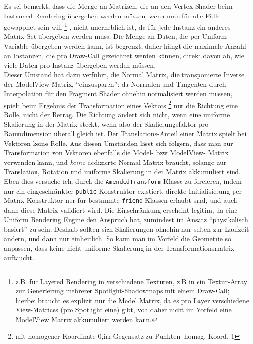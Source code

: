 	Es sei bemerkt, dass die Menge an Matrizen, die an den Vertex Shader beim Instanced Rendering übergeben
	werden müssen, wenn man für alle Fälle gewappnet sein will
	\footnote{z.B. für Layered Rendering in verschiedene Texturen, z.B in ein Textur-Array zur Generierung mehrerer 
	Spotlight-Shadowmaps mit einem Draw-Call; hierbei braucht es explizit nur die Model Matrix, da es pro Layer 
	verschiedene View-Matrices (pro Spotlight eine) gibt, von daher nicht im Vorfeld eine ModelView Matrix akkumuliert 
	werden kann.}
	, nicht unerheblich ist, da für jede Instanz ein anderes Matrix-Set übergeben werden muss.
	Die Menge an Daten, die per Uniform-Variable übergeben werden kann, ist begrenzt, daher hängt die maximale Anzahl
	an Instanzen, die pro Draw-Call gezeichnet werden können, direkt davon ab, wie viele Daten pro Instanz übergeben 
	werden müssen.\\
	Dieser Umstand hat dazu verführt, die Normal Matrix, die transponierte Inverse der ModelView-Matrix,
	"`einzusparen"': da Normalen und Tangenten durch Interpolation für den Fragment Shader ohnehin normalisiert werden 
	müssen, spielt beim Ergebnis  der Transformation eines Vektors 
	\footnote{mit homogener Koordinate 0,im Gegensatz zu Punkten, homog. Koord. 1} 
	nur die Richtung eine Rolle, nicht der Betrag. Die Richtung ändert sich nicht,
	wenn eine uniforme Skalierung in der Matrix steckt, wenn also der Skalierungsfaktor pro Raumdimension überall gleich 
	ist. Der Translations-Anteil einer Matrix spielt bei Vektoren keine Rolle. Aus diesen Umständen lässt sich folgern, 
	dass man zur Transformation von Vektoren ebenfalls die Model- bzw ModelView- Matrix verwenden kann, 
	und \emph{keine} dedizierte Normal Matrix braucht,
	solange nur Translation, Rotation und uniforme Skalierung in der Matrix akkumuliert sind.\\
	Eben dies versuche ich, durch die \lstinline|AmendedTransform|-Klasse zu forcieren, indem nur ein eingeschränkter
	\lstinline|public|-Konstruktor existiert, direkte Initialisierung per Matrix-Konstruktor nur für bestimmte
	\lstinline|friend|-Klassen erlaubt sind, und auch dann diese Matrix validiert wird.
	Die Einschränkung erscheint legitim, da eine Uniform Rendering Engine den Anspruch hat, zumindest
	im Ansatz "`physikalisch basiert"' zu sein. Deshalb sollten sich  Skalierungen ohnehin nur selten
	zur Laufzeit ändern, und dann nur einheitlich. So kann man im Vorfeld die Geometrie so anpassen, 
	dass keine nicht-uniforme Skalierung in der Transformationsmatrix auftaucht.
	

